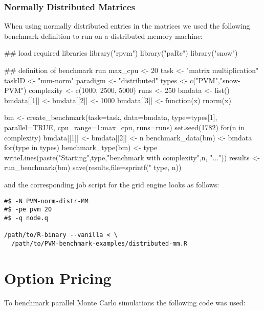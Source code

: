 \subsubsection{Normally Distributed Matrices}

When using normally distributed entries in the matrices we used the
following benchmark definition to run on a distributed memory machine:

\begin{Scode}
## load required libraries
library("rpvm")
library("paRc")
library("snow")

## definition of benchmark run
max_cpu <- 20
task <- "matrix multiplication"
taskID <- "mm-norm"
paradigm <- "distributed"
types <- c("PVM","snow-PVM")
complexity <- c(1000, 2500, 5000)
runs <- 250
bmdata <- list()
bmdata[[1]] <- bmdata[[2]] <- 1000
bmdata[[3]] <- function(x){
  rnorm(x)
}

bm <- create_benchmark(task=task, data=bmdata,
                       type=types[1], parallel=TRUE,
                       cpu_range=1:max_cpu, runs=runs)
set.seed(1782)
for(n in complexity){
  bmdata[[1]] <- bmdata[[2]] <- n
  benchmark_data(bm) <- bmdata
  for(type in types){
    benchmark_type(bm) <- type
    writeLines(paste("Starting",type,"benchmark with complexity",n,
                     "..."))
    results <- run_benchmark(bm)
    save(results,file=sprintf("%
                               type, n))
  }
}
\end{Scode}

and the corresponding job script for the grid engine looks as follows:

\begin{verbatim}
#$ -N PVM-norm-distr-MM
#$ -pe pvm 20
#$ -q node.q

/path/to/R-binary --vanilla < \
  /path/to/PVM-benchmark-examples/distributed-mm.R
\end{verbatim}

\section{Option Pricing}

To benchmark parallel Monte Carlo simulations the following code was
used:

